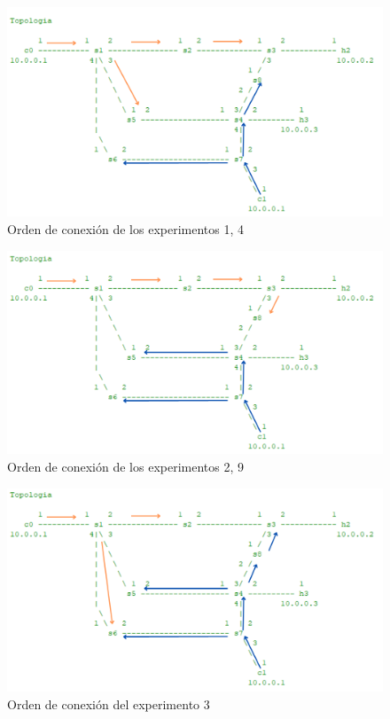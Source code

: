 \documentclass[a4paper, 12pt]{book}
\begin{document}
 	\begin{figure}[H]
 		\centering
 		\includegraphics[width=16cm, keepaspectratio]{img/escenario1_2c_1}
 		\caption{Orden de conexión de los experimentos 1, 4}
 		\label{figura:escenario1_2c_1}
 	\end{figure}
 	
 	\begin{figure}[H]
 		\centering
 		\includegraphics[width=16cm, keepaspectratio]{img/escenario1_2c_2}
 		\caption{Orden de conexión de los experimentos 2, 9}
 		\label{figura:escenario1_2c_2}
 	\end{figure}
 	
 	\begin{figure}[H]
 		\centering
 		\includegraphics[width=16cm, keepaspectratio]{img/escenario1_2c_3}
 		\caption{Orden de conexión del experimento 3}
 		\label{figura:escenario_2c_3}
 	\end{figure}
 	
\end{document}
